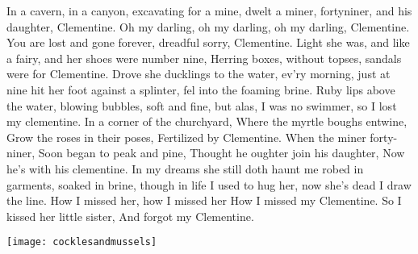 \beginverse
In a cavern, in a canyon,
excavating for a mine,
dwelt a miner, fortyniner, 
and his daughter, Clementine.
\endverse
\beginchorus
Oh my darling, oh my darling,
oh my darling, Clementine.
You are lost and gone forever,
dreadful sorry, Clementine.
\endchorus
\beginverse
Light she was, and like a fairy,
and her shoes were number nine,
Herring boxes, without topses,
sandals were for Clementine.
\endverse
\beginverse
Drove she ducklings to the water,
ev’ry morning, just at nine
hit her foot against a splinter,
fel into the foaming brine.
\endverse
\beginverse
Ruby lips above the water,
blowing bubbles, soft and fine,
but alas, I was no swimmer, 
so I lost my clementine.
\endverse
\beginverse
In a corner of the churchyard,
Where the myrtle boughs entwine,
Grow the roses in their poses,
Fertilized by Clementine.
\endverse
\beginverse
When the miner forty-niner,
Soon began to peak and pine,
Thought he oughter join his daughter,
Now he's with his clementine.
\endverse
\beginverse
In my dreams she still doth haunt me
robed in garments, soaked in brine,
though in life I used to hug her, 
now she’s dead I draw the line.
\endverse
\beginverse
How I missed her, how I missed her
How I missed my Clementine.
So I kissed her little sister,
And forgot my Clementine.
\endverse
\endsong
\begin{intersong}
    \texttt{[image: cocklesandmussels]}
\end{intersong}